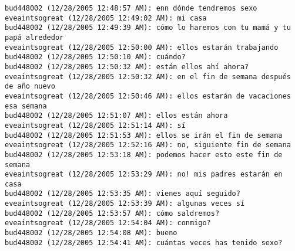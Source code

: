 \begin{verbatim}
bud448002 (12/28/2005 12:48:57 AM): enn dónde tendremos sexo
eveaintsogreat (12/28/2005 12:49:02 AM): mi casa
bud448002 (12/28/2005 12:49:39 AM): cómo lo haremos con tu mamá y tu papá alrededor
eveaintsogreat (12/28/2005 12:50:00 AM): ellos estarán trabajando
bud448002 (12/28/2005 12:50:10 AM): cuándo?
bud448002 (12/28/2005 12:50:32 AM): están ellos ahí ahora?
eveaintsogreat (12/28/2005 12:50:32 AM): en el fin de semana después de año nuevo
eveaintsogreat (12/28/2005 12:50:46 AM): ellos estarán de vacaciones esa semana
bud448002 (12/28/2005 12:51:07 AM): ellos están ahora
eveaintsogreat (12/28/2005 12:51:14 AM): sí
bud448002 (12/28/2005 12:51:53 AM): ellos se irán el fin de semana
eveaintsogreat (12/28/2005 12:52:16 AM): no, siguiente fin de semana
bud448002 (12/28/2005 12:53:18 AM): podemos hacer esto este fin de semana
eveaintsogreat (12/28/2005 12:53:29 AM): no! mis padres estarán en casa
bud448002 (12/28/2005 12:53:35 AM): vienes aquí seguido?
eveaintsogreat (12/28/2005 12:53:39 AM): algunas veces sí
bud448002 (12/28/2005 12:53:57 AM): cómo saldremos?
eveaintsogreat (12/28/2005 12:54:04 AM): conmigo?
bud448002 (12/28/2005 12:54:08 AM): bueno
bud448002 (12/28/2005 12:54:41 AM): cuántas veces has tenido sexo?
\end{verbatim}